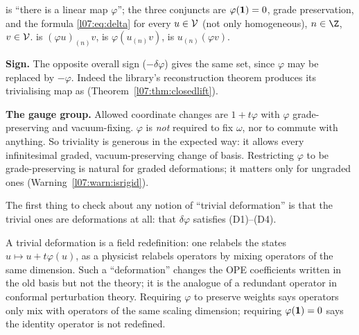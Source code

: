 \begin{dictionary}
 is ``there is a linear map $\varphi$''; the three conjuncts are
$\varphi(\mathbf{1}) = 0$, grade preservation, and the formula \eqref{l07:eq:delta} for every
$u\in\mathcal{V}$ (not only homogeneous), $n\in\Z$, $v\in\mathcal{V}$.  is
$(\varphi u)_{(n)}v$,  is $\varphi(u_{(n)}v)$,  is
$u_{(n)}(\varphi v)$.

\textbf{Sign.} The opposite overall sign ($-\delta\varphi$) gives the same set, since $\varphi$ may be
replaced by $-\varphi$. Indeed the library's reconstruction theorem produces its trivialising map as
 (Theorem~\ref{l07:thm:closedlift}).

\textbf{The gauge group.} Allowed coordinate changes are $1+t\varphi$ with $\varphi$ grade-preserving
and vacuum-fixing. $\varphi$ is \emph{not} required to fix $\omega$, nor to commute with anything.
So triviality is generous in the expected way: it allows every infinitesimal graded,
vacuum-preserving change of basis. Restricting $\varphi$ to be grade-preserving is natural for
graded deformations; it matters only for ungraded ones (Warning~\ref{l07:warn:isrigid}).
\end{dictionary}

The first thing to check about any notion of ``trivial deformation'' is that the trivial ones are
deformations at all: that $\delta\varphi$ satisfies (D1)--(D4).

\begin{physics}
A trivial deformation is a field redefinition: one relabels the states $u\mapsto u+t\varphi(u)$, as a physicist
relabels operators by mixing operators of the same dimension. Such a ``deformation'' changes the OPE
coefficients written in the old basis but not the theory; it is the analogue of a redundant operator in
conformal perturbation theory. Requiring $\varphi$ to preserve weights says operators only mix with operators
of the same scaling dimension; requiring $\varphi(\mathbf{1})=0$ says the identity operator is not redefined.
\end{physics}

